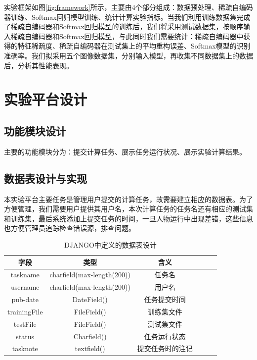\documentclass[oneside]{ZJUthesis}
\begin{document}
实验框架如图\ref{fig:framework}所示，主要由4个部分组成：数据预处理、稀疏自编码器训练、Softmax回归模型训练、统计计算实验指标。当我们利用训练数据集完成了稀疏自编码器和Softmax回归模型的训练后，我们将采用测试数据集，按顺序输入稀疏自编码器和Softmax回归模型，与此同时我们需要统计：稀疏自编码器中获得的特征稀疏度、稀疏自编码器在测试集上的平均重构误差、Softmax模型的识别准确率。我们拟采用五个图像数据集，分别输入模型，再收集不同数据集上的数据后，分析其性能表现。


\chapter{实验平台设计}
\section{功能模块设计}
主要的功能模块分为：提交计算任务、展示任务运行状况、展示实验计算结果。

\section{数据表设计与实现}
本实验平台主要任务是管理用户提交的计算任务，故需要建立相应的数据表。为了方便管理，我们需要用户提供其用户名，本次计算任务的任务名还有相应的测试集和训练集，最后系统添加上提交任务的时间，一旦人物运行中出现差错，这些信息也方便管理员追踪检查错误源，排查问题。
\begin{table}[h]
\begin{center}
{
\caption{DJANGO中定义的数据表设计}}
\begin{tabular}{|c|c|c|c|c|c|}
\hline
字段& 类型&含义\\
\hline
taskname &charfield(max-length(200)) &任务名\\
\hline
username &charfield(max-length(200)) &  用户名\\
\hline
pub-date & DateField()& 任务提交时间\\
\hline
trainingFile  & FileField() &  训练集文件\\
\hline
testFile & FileField() &  测试集文件\\
\hline
status &Charfield() & 任务运行状态\\
\hline
tasknote  & textfield() & 提交任务时的注记 \\
\hline
\end{tabular}
\end{center}
\end{table}
\end{document}

